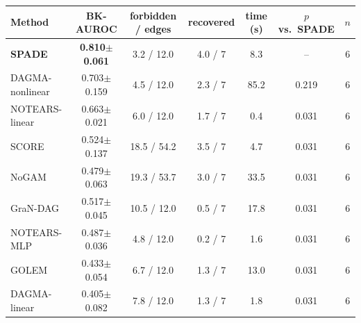 \begin{tabular}{lcccccc}
\toprule
Method & BK-AUROC & forbidden / edges & recovered & time (s) & $p$ vs.\ SPADE & $n$ \\ \midrule
\textbf{SPADE} & \textbf{0.810$\pm$0.061} & 3.2 / 12.0 & 4.0 / 7 & 8.3 & -- & 6 \\
DAGMA-nonlinear & 0.703$\pm$0.159 & 4.5 / 12.0 & 2.3 / 7 & 85.2 & 0.219 & 6 \\
NOTEARS-linear & 0.663$\pm$0.021 & 6.0 / 12.0 & 1.7 / 7 & 0.4 & 0.031 & 6 \\
SCORE & 0.524$\pm$0.137 & 18.5 / 54.2 & 3.5 / 7 & 4.7 & 0.031 & 6 \\
NoGAM & 0.479$\pm$0.063 & 19.3 / 53.7 & 3.0 / 7 & 33.5 & 0.031 & 6 \\
GraN-DAG & 0.517$\pm$0.045 & 10.5 / 12.0 & 0.5 / 7 & 17.8 & 0.031 & 6 \\
NOTEARS-MLP & 0.487$\pm$0.036 & 4.8 / 12.0 & 0.2 / 7 & 1.6 & 0.031 & 6 \\
GOLEM & 0.433$\pm$0.054 & 6.7 / 12.0 & 1.3 / 7 & 13.0 & 0.031 & 6 \\
DAGMA-linear & 0.405$\pm$0.082 & 7.8 / 12.0 & 1.3 / 7 & 1.8 & 0.031 & 6 \\
\bottomrule
\end{tabular}
